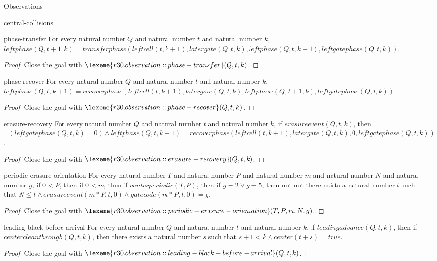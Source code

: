 \begin{lexlean}{Observations}
\begin{section}{central-collisions}
\begin{theorem}{phase-transfer}
For every natural number \(Q\) and natural number \(t\) and natural number \(k\), \(leftphase(Q, t + 1, k) = transferphase(leftcell(t, k + 1), latergate(Q, t, k), leftphase(Q, t, k + 1), leftgatephase(Q, t, k))\).
\begin{proof}
Close the goal with \(\lexeme{r30.observation::phase-transfer}(Q, t, k)\).
\end{proof}
\end{theorem}

\begin{theorem}{phase-recover}
For every natural number \(Q\) and natural number \(t\) and natural number \(k\), \(leftphase(Q, t, k + 1) = recoverphase(leftcell(t, k + 1), latergate(Q, t, k), leftphase(Q, t + 1, k), leftgatephase(Q, t, k))\).
\begin{proof}
Close the goal with \(\lexeme{r30.observation::phase-recover}(Q, t, k)\).
\end{proof}
\end{theorem}

\begin{theorem}{erasure-recovery}
For every natural number \(Q\) and natural number \(t\) and natural number \(k\), if \(erasureevent(Q, t, k)\), then \(¬ (leftgatephase(Q, t, k) = 0) ∧ leftphase(Q, t, k + 1) = recoverphase(leftcell(t, k + 1), latergate(Q, t, k), 0, leftgatephase(Q, t, k))\).
\begin{proof}
Close the goal with \(\lexeme{r30.observation::erasure-recovery}(Q, t, k)\).
\end{proof}
\end{theorem}

\begin{theorem}{periodic-erasure-orientation}
For every natural number \(T\) and natural number \(P\) and natural number \(m\) and natural number \(N\) and natural number \(g\), if \(0 < P\), then if \(0 < m\), then if \(centerperiodic(T, P)\), then if \(g = 2 ∨ g = 5\), then not not there exists a natural number \(t\) such that \(N ≤ t ∧ erasureevent(m * P, t, 0) ∧ gatecode(m * P, t, 0) = g\).
\begin{proof}
Close the goal with \(\lexeme{r30.observation::periodic-erasure-orientation}(T, P, m, N, g)\).
\end{proof}
\end{theorem}

\begin{theorem}{leading-black-before-arrival}
For every natural number \(Q\) and natural number \(t\) and natural number \(k\), if \(leadingadvance(Q, t, k)\), then if \(centercleanthrough(Q, t, k)\), then there exists a natural number \(s\) such that \(s + 1 < k ∧ center(t + s) = true\).
\begin{proof}
Close the goal with \(\lexeme{r30.observation::leading-black-before-arrival}(Q, t, k)\).
\end{proof}
\end{theorem}


\end{section}
\end{lexlean}
